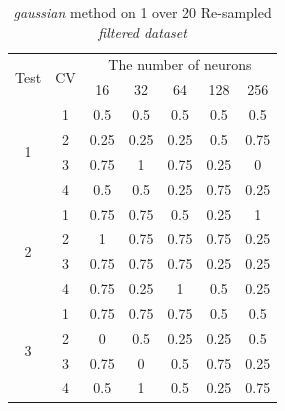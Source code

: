 \documentclass[draft,dvipsnames]{drexel-thesis}
\begin{document}
\begin{thesis}
\begin{table}[!t]
\centering
\caption{{\em gaussian} method on 1 over 20 Re-sampled {\em filtered dataset}}
\label{tbl:gaussian_1_20}
\begin{tabular}{|c|c|c|c|c|c|c|}
\hline
\multirow{2}{*}{Test} & \multirow{2}{*}{CV} & \multicolumn{5}{c|}{The number of neurons}                               \\ \cline{3-7}
                      &                     & 16           & 32           & 64           & 128          & 256          \\ \hline
\multirow{4}{*}{1}    & 1                   & 0.5          & 0.5          & 0.5          & 0.5          & 0.5          \\ \cline{2-7}
                      & 2                   & 0.25         & 0.25         & 0.25         & 0.5          & 0.75         \\ \cline{2-7}
                      & 3                   & 0.75         & 1            & 0.75         & 0.25         & 0            \\ \cline{2-7}
                      & 4                   & 0.5          & 0.5          & 0.25         & 0.75         & 0.25         \\ \hline
\multirow{4}{*}{2}    & 1                   & 0.75         & 0.75         & 0.5          & 0.25         & 1            \\ \cline{2-7}
                      & 2                   & 1            & 0.75         & 0.75         & 0.75         & 0.25         \\ \cline{2-7}
                      & 3                   & 0.75         & 0.75         & 0.75         & 0.25         & 0.25         \\ \cline{2-7}
                      & 4                   & 0.75         & 0.25         & 1            & 0.5          & 0.25         \\ \hline
\multirow{4}{*}{3}    & 1                   & 0.75         & 0.75         & 0.75         & 0.5          & 0.5          \\ \cline{2-7}
                      & 2                   & 0            & 0.5          & 0.25         & 0.25         & 0.5          \\ \cline{2-7}
                      & 3                   & 0.75         & 0            & 0.5          & 0.75         & 0.25         \\ \cline{2-7}
                      & 4                   & 0.5          & 1            & 0.5          & 0.25         & 0.75         \\ \hline

\end{tabular}
\end{table}
\end{thesis}
\end{document}
